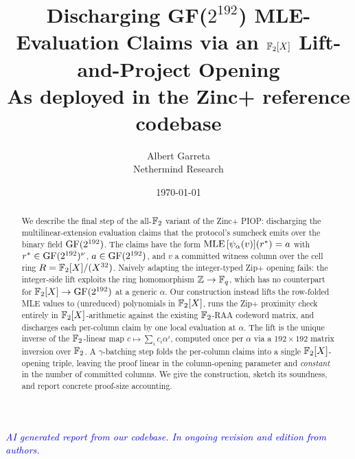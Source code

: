 \documentclass[11pt]{article}
\title{Discharging GF($2^{192}$) MLE-Evaluation Claims via an
       $\mathbb{F}_2[X]$ Lift-and-Project Opening \\
       \large As deployed in the Zinc+ reference codebase}
\author{Albert Garreta \\[2pt] \normalsize Nethermind Research}
\date{\today}
\begin{document}
\maketitle

\begin{center}
\textcolor{blue}{\textit{AI generated report from our codebase. In ongoing revision and edition from authors.}}
\end{center}
\vspace{0.5em}

\begin{abstract}
We describe the final step of the all-$\mathbb{F}_2$ variant of the Zinc+
PIOP: discharging the multilinear-extension evaluation claims that
the protocol's sumcheck emits over the binary field $\mathrm{GF}(2^{192})$. The claims
have the form $\operatorname{MLE}{[\psi_{\alpha}(v)]}(r^*) = a$ with
$r^* \in \mathrm{GF}(2^{192})^{\nu}$, $a \in \mathrm{GF}(2^{192})$, and $v$ a committed witness
column over the cell ring $R = \mathbb{F}_2[X]/(X^{32})$. Naively
adapting the integer-typed Zip+ opening fails: the integer-side
lift exploits the ring homomorphism $\mathbb{Z} \to \mathbb{F}_q$, which has no
counterpart for $\mathbb{F}_2[X] \to \mathrm{GF}(2^{192})$ at a generic $\alpha$. Our
construction instead lifts the row-folded MLE values to (unreduced)
polynomials in $\mathbb{F}_2[X]$, runs the Zip+ proximity check entirely
in $\mathbb{F}_2[X]$-arithmetic against the existing $\mathbb{F}_2$-RAA codeword
matrix, and discharges each per-column claim by one local
evaluation at $\alpha$. The lift is the unique inverse of the
$\mathbb{F}_2$-linear map $c \mapsto \sum_i c_i \alpha^i$, computed once per
$\alpha$ via a $192\times 192$ matrix inversion over $\mathbb{F}_2$. A
$\gamma$-batching step folds the per-column claims into a single
$\mathbb{F}_2[X]$-opening triple, leaving the proof linear in the
column-opening parameter and \emph{constant} in the number of
committed columns. We give the construction, sketch its soundness,
and report concrete proof-size accounting.
\end{abstract}

\tableofcontents







\end{document}
